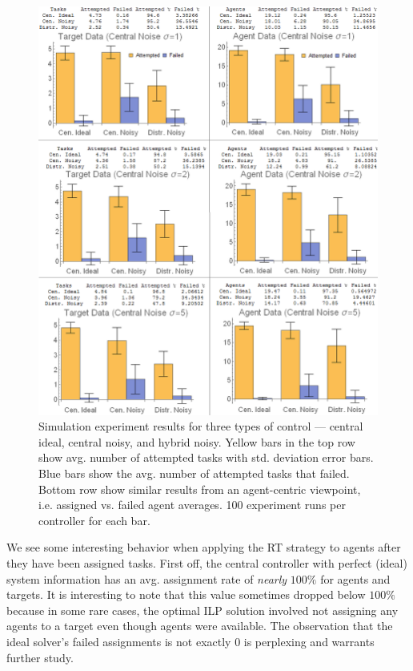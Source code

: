 \documentclass[defaultstyle,12pt]{thesis}
\begin{document}
\begin{figure}[!ht]
	\centering\includegraphics[width=\textwidth]{../assets/staticExpResultsWithTables.png}
	\centering\caption{Simulation experiment results for three types of control --- central ideal, central noisy, and hybrid noisy. Yellow bars in the top row show avg. number of attempted tasks with std. deviation error bars. Blue bars show the avg. number of attempted tasks that failed. Bottom row show similar results from an agent-centric viewpoint, i.e. assigned vs. failed agent averages. 100 experiment runs per controller for each bar.}\label{fig:controlexpresults}
\end{figure}

We see some interesting behavior when applying the RT strategy to agents after they have been assigned tasks. First off, the central controller with perfect (ideal) system information has an avg. assignment rate of \textit{nearly} $100\%$ for agents and targets. It is interesting to note that this value sometimes dropped below $100\%$ because in some rare cases, the optimal ILP solution involved not assigning any agents to a target even though agents were available. The observation that the ideal solver's failed assignments is not exactly $0$ is perplexing and warrants further study.
\end{document}
